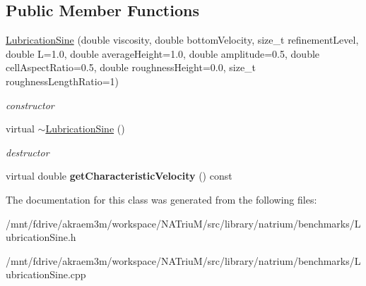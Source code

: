 \subsection*{Public Member Functions}
\begin{DoxyCompactItemize}
\item 
\hypertarget{classnatrium_1_1LubricationSine_aabde5d90ece7568bd26539679554dce3}{
\hyperlink{classnatrium_1_1LubricationSine_aabde5d90ece7568bd26539679554dce3}{LubricationSine} (double viscosity, double bottomVelocity, size\_\-t refinementLevel, double L=1.0, double averageHeight=1.0, double amplitude=0.5, double cellAspectRatio=0.5, double roughnessHeight=0.0, size\_\-t roughnessLengthRatio=1)}
\label{classnatrium_1_1LubricationSine_aabde5d90ece7568bd26539679554dce3}

\begin{DoxyCompactList}\small\item\em constructor \item\end{DoxyCompactList}\item 
\hypertarget{classnatrium_1_1LubricationSine_a5ccd2adc86fca412bbf13027ed5095dd}{
virtual \hyperlink{classnatrium_1_1LubricationSine_a5ccd2adc86fca412bbf13027ed5095dd}{$\sim$LubricationSine} ()}
\label{classnatrium_1_1LubricationSine_a5ccd2adc86fca412bbf13027ed5095dd}

\begin{DoxyCompactList}\small\item\em destructor \item\end{DoxyCompactList}\item 
\hypertarget{classnatrium_1_1LubricationSine_a141a35675ac18a639af4aa7d0690c96d}{
virtual double {\bfseries getCharacteristicVelocity} () const }
\label{classnatrium_1_1LubricationSine_a141a35675ac18a639af4aa7d0690c96d}

\end{DoxyCompactItemize}


The documentation for this class was generated from the following files:\begin{DoxyCompactItemize}
\item 
/mnt/fdrive/akraem3m/workspace/NATriuM/src/library/natrium/benchmarks/LubricationSine.h\item 
/mnt/fdrive/akraem3m/workspace/NATriuM/src/library/natrium/benchmarks/LubricationSine.cpp\end{DoxyCompactItemize}
